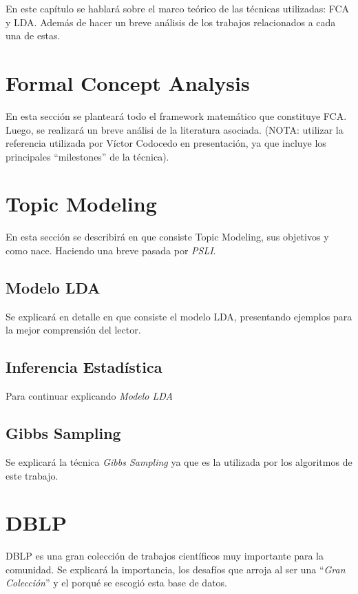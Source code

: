 En este capítulo se hablará sobre el marco teórico de las técnicas utilizadas: FCA y LDA. Además de hacer un breve análisis de los trabajos relacionados a cada una de estas.

\section{Formal Concept Analysis}
\label{sec:fca}

En esta sección se planteará todo el framework matemático que constituye FCA. Luego, se realizará un breve análisi de la literatura asociada. (NOTA: utilizar la referencia utilizada por Víctor Codocedo en presentación, ya que incluye los principales ``milestones'' de la técnica).

\section{Topic Modeling}
\label{sec:topicmodeling}

En esta sección se describirá en que consiste Topic Modeling, sus objetivos y como nace. Haciendo una breve pasada por \emph{PSLI}.

\subsection{Modelo LDA}
\label{subsec:ldamodel}
Se explicará en detalle en que consiste el modelo LDA, presentando ejemplos para la mejor comprensión del lector.

\subsection{Inferencia Estadística}
\label{subsec:infest}
Para continuar explicando \emph{Modelo LDA}

\subsection{Gibbs Sampling}
\label{subsec:gibbssampling}
Se explicará la técnica \emph{Gibbs Sampling} ya que es la utilizada por los algoritmos de este trabajo.

\section{DBLP}
\label{sec:dblp}
DBLP es una gran colección de trabajos científicos muy importante para la comunidad. Se explicará la importancia, los desafíos que arroja al ser una ``\emph{Gran Colección}'' y el porqué se escogió esta base de datos.